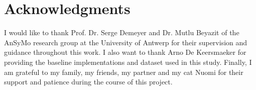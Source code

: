 
\section*{Acknowledgments}

I would like to thank Prof. Dr. Serge Demeyer and Dr. Mutlu Beyazit of the AnSyMo research group at the University of Antwerp for their supervision and guidance throughout this work.
I also want to thank Arno De Keersmaeker for providing the baseline implementations and dataset used in this study.
Finally, I am grateful to my family, my friends, my partner and my cat Nuomi for their support and patience during the course of this project.

